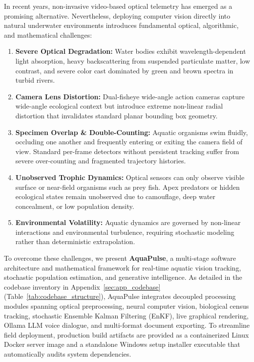 \documentclass[11pt,a4paper]{article}
\newcommand{\refblue}[1]{\ref{#1}}
\begin{document}
In recent years, non-invasive video-based optical telemetry has emerged as a promising alternative. Nevertheless, deploying computer vision directly into natural underwater environments introduces fundamental optical, algorithmic, and mathematical challenges:
\begin{enumerate}
    \item \textbf{Severe Optical Degradation:} Water bodies exhibit wavelength-dependent light absorption, heavy backscattering from suspended particulate matter, low contrast, and severe color cast dominated by green and brown spectra in turbid rivers.
    \item \textbf{Camera Lens Distortion:} Dual-fisheye wide-angle action cameras capture wide-angle ecological context but introduce extreme non-linear radial distortion that invalidates standard planar bounding box geometry.
    \item \textbf{Specimen Overlap \& Double-Counting:} Aquatic organisms swim fluidly, occluding one another and frequently entering or exiting the camera field of view. Standard per-frame detectors without persistent tracking suffer from severe over-counting and fragmented trajectory histories.
    \item \textbf{Unobserved Trophic Dynamics:} Optical sensors can only observe visible surface or near-field organisms such as prey fish. Apex predators or hidden ecological states remain unobserved due to camouflage, deep water concealment, or low population density.
    \item \textbf{Environmental Volatility:} Aquatic dynamics are governed by non-linear interactions and environmental turbulence, requiring stochastic modeling rather than deterministic extrapolation.
\end{enumerate}

To overcome these challenges, we present \textbf{AquaPulse}, a multi-stage software architecture and mathematical framework for real-time aquatic vision tracking, stochastic population estimation, and generative intelligence. As detailed in the codebase inventory in Appendix~\refblue{sec:app_codebase} (Table~\refblue{tab:codebase_structure}), AquaPulse integrates decoupled processing modules spanning optical preprocessing, neural computer vision, biological census tracking, stochastic Ensemble Kalman Filtering (EnKF), live graphical rendering, Ollama LLM voice dialogue, and multi-format document exporting. To streamline field deployment, production build artifacts are provided as a containerized Linux Docker server image and a standalone Windows setup installer executable that automatically audits system dependencies.
\end{document}

